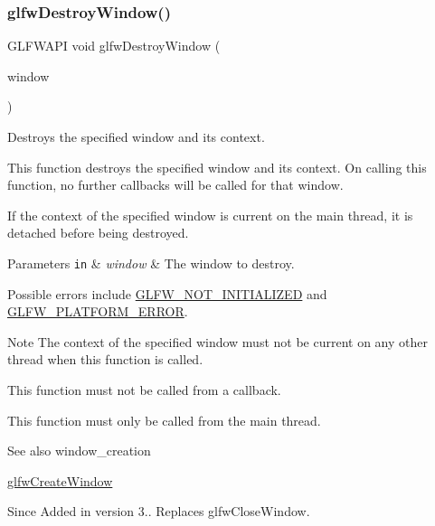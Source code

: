 \subsubsection{\texorpdfstring{glfw\+Destroy\+Window()}{glfwDestroyWindow()}}
{\footnotesize\ttfamily G\+L\+F\+W\+A\+PI void glfw\+Destroy\+Window (\begin{DoxyParamCaption}\item[{\hyperlink{group__window_ga3c96d80d363e67d13a41b5d1821f3242}{G\+L\+F\+Wwindow} $\ast$}]{window }\end{DoxyParamCaption})}



Destroys the specified window and its context. 

This function destroys the specified window and its context. On calling this function, no further callbacks will be called for that window.

If the context of the specified window is current on the main thread, it is detached before being destroyed.


\begin{DoxyParams}[1]{Parameters}
\mbox{\tt in}  & {\em window} & The window to destroy.\\
\hline
\end{DoxyParams}
Possible errors include \hyperlink{group__errors_ga2374ee02c177f12e1fa76ff3ed15e14a}{G\+L\+F\+W\+\_\+\+N\+O\+T\+\_\+\+I\+N\+I\+T\+I\+A\+L\+I\+Z\+ED} and \hyperlink{group__errors_gad44162d78100ea5e87cdd38426b8c7a1}{G\+L\+F\+W\+\_\+\+P\+L\+A\+T\+F\+O\+R\+M\+\_\+\+E\+R\+R\+OR}.

\begin{DoxyNote}{Note}
The context of the specified window must not be current on any other thread when this function is called.
\end{DoxyNote}
This function must not be called from a callback.

This function must only be called from the main thread.

\begin{DoxySeeAlso}{See also}
window\+\_\+creation 

\hyperlink{group__window_ga680a02abe0e4494b6759d5703240713e}{glfw\+Create\+Window}
\end{DoxySeeAlso}
\begin{DoxySince}{Since}
Added in version 3.. Replaces {\ttfamily glfw\+Close\+Window}. 
\end{DoxySince}
\mbox{\label{group__window_ga0da0e3daaa2d100f44a115c09077b510}} 
